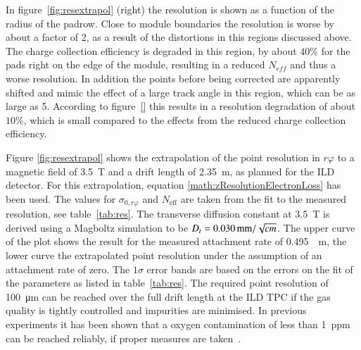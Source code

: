 \documentclass[preprint]{elsarticle}
\begin{document}
In figure~\ref{fig:resextrapol} (right) the resolution is shown as a function of the radius of the padrow. Close to module boundaries the resolution is worse by about a factor of 2, as a result of the distortions in this regions discussed above. The charge collection efficiency 
is degraded in this region, by about $40\%$ for the pads right on the edge of the module, resulting in a reduced $N_{eff}$ and thus a worse resolution. In addition the points before being corrected are apparently shifted and mimic the effect of a large track angle in this region, which can be as large as 5\degree. According to figure~\ref{} this results in a resolution degradation of about $10 \%$, which is small compared to the effects from the reduced charge collection efficiency. 


Figure \ref{fig:resextrapol} shows the extrapolation of the point resolution in $r\varphi$ to a magnetic field of \SI{3.5}{\tesla} and a drift length of \SI{2.35}{\m}, as planned for the ILD detector. For this extrapolation, equation \eqref{math:zResolutionElectronLoss} has been used. The values for $\sigma_{0,r\varphi}$ and $N_{\mathrm{eff}}$ are taken from the fit to the measured resolution, see table~\ref{tab:res}. The transverse diffusion constant at \SI{3.5}{\tesla} is derived using a Magboltz simulation to be $D_t=\SI[per-mode=symbol]{0.030}{\mm \per \sqrt{\cm}}$. 
The upper curve of the plot shows the result for the measured attachment rate of \SI{0.495}{\per \m}, the lower curve the extrapolated point resolution under the assumption of an attachment rate of zero. The $1\sigma$ error bands are based on the errors on the fit of the parameters as listed in table~\ref{tab:res}. The required point resolution of \SI{100}{\um} can be reached over the full drift length at the ILD TPC if the gas quality is tightly controlled and impurities are minimised. In previous experiments it has been shown that a oxygen contamination of less than 1~ppm can be reached reliably, if proper measures are taken~\cite{Abgrall201125}. 
\end{document}
